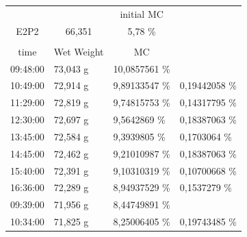 \begin{table}[]
	\centering
	\begin{tabular}{llll}
		\cline{3-3}
		& \multicolumn{1}{l|}{} & \multicolumn{1}{c|}{initial MC} &  \\ \cline{1-3}
		\multicolumn{1}{|c|}{\cellcolor[HTML]{C65911}E2P2} & \multicolumn{1}{c|}{\cellcolor[HTML]{C65911}66,351} & \multicolumn{1}{c|}{5,78 \%} &  \\ \cline{1-3}
		&  &  &  \\ \cline{1-3}
		\multicolumn{1}{|c|}{\cellcolor[HTML]{C0C0C0}time} & \multicolumn{1}{c|}{\cellcolor[HTML]{C0C0C0}Wet Weight} & \multicolumn{1}{c|}{\cellcolor[HTML]{C0C0C0}MC} &  \\ \cline{1-3}
		\multicolumn{1}{|l|}{09:48:00} & \multicolumn{1}{l|}{73,043 g} & \multicolumn{1}{l|}{10,0857561   \%} &  \\ \hline
		\multicolumn{1}{|l|}{10:49:00} & \multicolumn{1}{l|}{72,914 g} & \multicolumn{1}{l|}{9,89133547   \%} & \multicolumn{1}{l|}{0,19442058 \%} \\ \hline
		\multicolumn{1}{|l|}{11:29:00} & \multicolumn{1}{l|}{72,819 g} & \multicolumn{1}{l|}{9,74815753   \%} & \multicolumn{1}{l|}{0,14317795 \%} \\ \hline
		\multicolumn{1}{|l|}{12:30:00} & \multicolumn{1}{l|}{72,697 g} & \multicolumn{1}{l|}{9,5642869   \%} & \multicolumn{1}{l|}{0,18387063 \%} \\ \hline
		\multicolumn{1}{|l|}{13:45:00} & \multicolumn{1}{l|}{72,584 g} & \multicolumn{1}{l|}{9,3939805   \%} & \multicolumn{1}{l|}{0,1703064 \%} \\ \hline
		\multicolumn{1}{|l|}{14:45:00} & \multicolumn{1}{l|}{72,462 g} & \multicolumn{1}{l|}{9,21010987   \%} & \multicolumn{1}{l|}{0,18387063 \%} \\ \hline
		\multicolumn{1}{|l|}{15:40:00} & \multicolumn{1}{l|}{72,391 g} & \multicolumn{1}{l|}{9,10310319   \%} & \multicolumn{1}{l|}{0,10700668 \%} \\ \hline
		\multicolumn{1}{|l|}{16:36:00} & \multicolumn{1}{l|}{72,289 g} & \multicolumn{1}{l|}{8,94937529   \%} & \multicolumn{1}{l|}{0,1537279 \%} \\ \hline
		\multicolumn{1}{|l|}{\cellcolor[HTML]{A5A5A5}09:39:00} & \multicolumn{1}{l|}{71,956 g} & \multicolumn{1}{l|}{8,44749891   \%} &  \\ \hline
		\multicolumn{1}{|l|}{10:34:00} & \multicolumn{1}{l|}{71,825 g} & \multicolumn{1}{l|}{8,25006405   \%} & \multicolumn{1}{l|}{0,19743485 \%} \\ \hline

\end{tabular}
\end{table}
